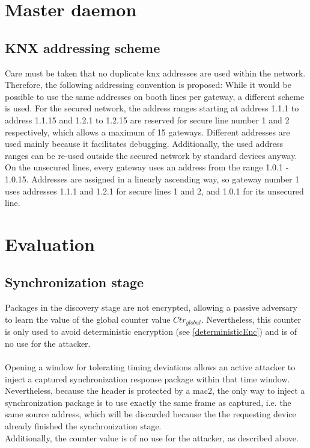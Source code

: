 \section{Master daemon}

\subsection{KNX addressing scheme}

Care must be taken that no duplicate knx addresses are used within the network. Therefore, the following addressing convention is proposed:
While it would be possible to use the same addresses on booth lines per gateway, a different scheme is used.
For the secured network, the address ranges starting at address 1.1.1 to address 1.1.15 and 1.2.1 to 1.2.15 are reserved for secure line number
1 and 2 respectively, which allows a maximum of 15 gateways. Different addresses are used mainly because it facilitates debugging. Additionally, the used
address ranges can be re-used outside the secured network by standard devices anyway.
On the unsecured lines, every gateway uses an address from the range 1.0.1 - 1.0.15. Addresses are assigned in a linearly ascending way, so gateway number 1
uses addresses 1.1.1 and 1.2.1 for secure lines 1 and 2, and 1.0.1 for its unsecured line.

\section{Evaluation}

\subsection{Synchronization stage}
Packages in the discovery stage are not encrypted, allowing a passive adversary to learn the value of the global counter value $Ctr_{global}$. Nevertheless,
this counter is only used to avoid deterministic encryption (see \ref{deterministicEnc}) and is of no use for the attacker.
\\
\\
Opening a window for tolerating timing deviations allows an active attacker to inject a captured synchronization response package within that time window.
Nevertheless, because the header is protected by a \gls{mac2}, the only way to inject a synchronization package is to use exactly the same frame as captured,
i.e. the same source address, which will be discarded because the the requesting device already finished the synchronization stage.
\\
Additionally, the counter value is of no use for the attacker, as described above.

